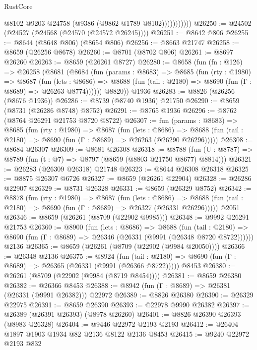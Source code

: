 \begin{lexlean}{RustCore}
\begin{coremodule}
                      @8102
                      @9203
                      @24758
                      (@9386 (@9862 @1789 @8102)))))))))))
@26250 := @24502 (@24527 (@24568 (@24570 (@24572 @26245))))
@26251 := @8642 @806
@26255 := @8644 (@8648 @806) (@8654 @806)
@26256 := @8663 @21747
@26258 := @8659 (@26256 @8678)
@26260 := @8701 (@8702 @806)
@26261 := @8697 @26260
@26263 := @8659 (@26261 @8727)
@26280 := @8658
    (fun (fn : @126) =>
    @26258
      (@8681
        (@8684
          (fun (params : @8683) =>
          @8685
            (fun (rty : @1980) =>
            @8687
              (fun (lets : @8686) =>
              @8688 (fun (tail : @2180) => @8690 (fun (Γ : @8689) => @26263 @8774))))))
        @8820))
    @1936
@26283 := @8826 (@26256 (@8676 @1936))
@26286 := @8739 (@8740 @1936) @21750
@26290 := @8659 (@8731 (@26286 @8748) @8752)
@26291 := @8765 @1936
@26296 := @8762 (@8764 @26291 @21753 @8720 @8722)
@26307 := fun (params : @8683) =>
  @8685
    (fun (rty : @1980) =>
    @8687
      (fun (lets : @8686) =>
      @8688 (fun (tail : @2180) => @8690 (fun (Γ : @8689) => @26263 (@26290 @26296)))))
@26308 := @8684 @26307
@26309 := @8681 @26308
@26318 := @8788
    (fun (U : @8787) => @8789 (fun (t : @7) => @8797 (@8659 (@8803 @21750 @8677) @8814)))
@26321 := @26283 (@26309 @26318) @21748
@26323 := @8644 @26308 @26318
@26325 := @8875 @26307 @6726
@26327 := @8659 (@26261 @22904)
@26328 := @26286 @22907
@26329 := @8731 @26328
@26331 := @8659 (@26329 @8752)
@26342 := @8878
    (fun (rty : @1980) =>
    @8687
      (fun (lets : @8686) =>
      @8688 (fun (tail : @2180) => @8690 (fun (Γ : @8689) => @26327 (@26331 @26296)))))
    @2051
@26346 := @8659 (@26261 (@8709 (@22902 @9985)))
@26348 := @9992 @26291 @21753
@26360 := @8900
    (fun (lets : @8686) =>
    @8688
      (fun (tail : @2180) =>
      @8690 (fun (Γ : @8689) => @26346 (@26331 (@9991 (@26348 @8720 @8722))))))
    @2136
@26365 := @8659 (@26261 (@8709 (@22902 (@9984 @20050))))
@26366 := @26348 @2136
@26375 := @8924
    (fun (tail : @2180) => @8690 (fun (Γ : @8689) => @26365 (@26331 (@9991 (@26366 @8722)))))
    @8453
@26380 := @26261 (@8709 (@22902 (@9984 (@8719 @8454))))
@26381 := @8659 @26380
@26382 := @26366 @8453
@26388 := @8942 (fun (Γ : @8689) => @26381 (@26331 (@9991 @26382))) @22972
@26389 := @8826 @26380
@26390 := @26329 @22975
@26391 := @8659 @26390
@26393 := @22978 @9990 @26382
@26397 := @26389 (@26391 @26393) (@8978 @26260)
@26401 := @8826 @26390 @26393 (@8983 @26328)
@26404 := @9446 @22972 @2193 @2193
@26412 := @26404 @1897 @1903 @1934 @82 @2136 @8122 @2136 @8453
@26415 := @9240 @22972 @2193 @832

\end{coremodule}
\end{lexlean}
